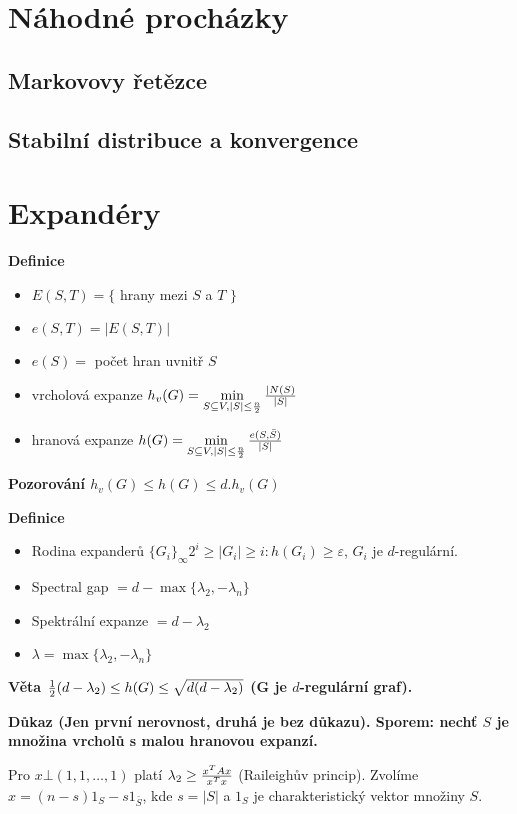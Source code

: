 \documentclass[a4paper,12pt,titlepage]{article}
\newcommand{\dk}{\smallskip\noindent\bf Důkaz\rm{} }
\newcommand{\df}{\smallskip\noindent\bf Definice\rm{} }
\newcommand{\vt}{\smallskip\noindent\bf Věta\rm{} }
\newcommand{\poz}{\smallskip\noindent\bf Pozorování\rm{} }
\begin{document}
\section{Náhodné procházky}
\subsection{Markovovy řetězce}
\subsection{Stabilní distribuce a konvergence}

\section{Expandéry}

\df
\begin{itemize}
	\item $E(S,T) = \{$ hrany mezi $S$ a $T$ $\}$
	\item $e(S,T) = |E(S,T)|$
	\item $e(S) = $ počet hran uvnitř $S$
	\item vrcholová expanze $h_v(G) = \min\limits_{S\subseteq V, |S|\le {n\over 2}} {|N(S) \over |S|}$
	\item hranová expanze $h(G) = \min\limits_{S\subseteq V, |S|\le {n\over 2}} {e(S,\bar S) \over |S|}$
\end{itemize}

\poz $h_v(G) \le h(G) \le d . h_v(G)$

\df 
\begin{itemize}
	\item Rodina expanderů $\{G_i\}_\infty$\quad$2^i \ge |G_i| \ge i: h(G_i) \ge \varepsilon$, $G_i$ je $d$-regulární.
	\item Spectral gap $= d - \max\{\lambda_2,-\lambda_n\}$
	\item Spektrální expanze $= d - \lambda_2$
	\item $\lambda = \max\{\lambda_2,-\lambda_n\}$
\end{itemize}

\vt ${1\over 2}(d-\lambda_2) \le h(G) \le \sqrt{d(d-\lambda_2)}$ (G je $d$-regulární graf).

\dk (Jen první nerovnost, druhá je bez důkazu). Sporem: nechť $S$ je množina
vrcholů s malou hranovou expanzí.

Pro $x \bot (1,1,\dots,1)$ platí $\lambda_2 \ge {x^TAx\over x^Tx}$ (Raileighův
princip). Zvolíme $x = (n-s)1_S - s1_{\bar S}$, kde $s = |S|$ a $1_S$ je
charakteristický vektor množiny $S$.
\end{document}
